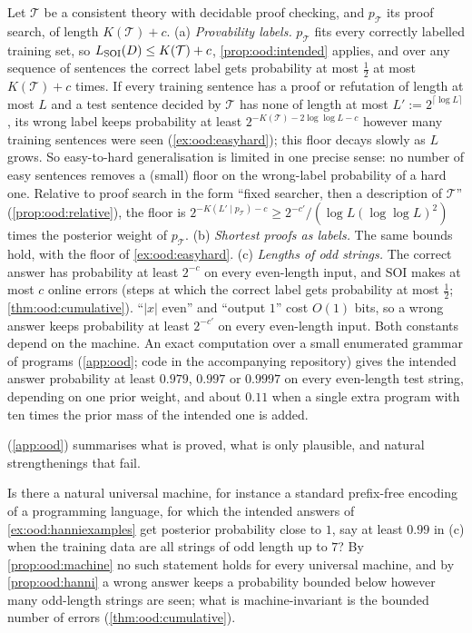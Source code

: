 \begin{example}\label{ex:ood:hanniexamples}
Let $\mathcal T$ be a consistent theory with decidable proof checking, and $p_{\mathcal T}$ its proof search, of length $K(\mathcal T)+c$.
(a) \emph{Provability labels.} $p_{\mathcal T}$ fits every correctly labelled training set, so $L_{\mathrm{SOI}}(D)\le K(\mathcal T)+c$, \cref{prop:ood:intended} applies, and over any sequence of sentences the correct label gets probability at most $\frac12$ at most $K(\mathcal T)+c$ times. If every training sentence has a proof or refutation of length at most $L$ and a test sentence decided by $\mathcal T$ has none of length at most $L':=2^{\lceil\log L\rceil}$, its wrong label keeps probability at least $2^{-K(\mathcal T)-2\log\log L-c}$ however many training sentences were seen (\cref{ex:ood:easyhard}); this floor decays slowly as $L$ grows. So easy-to-hard generalisation is limited in one precise sense: no number of easy sentences removes a (small) floor on the wrong-label probability of a hard one. Relative to proof search in the form ``fixed searcher, then a description of $\mathcal T$'' (\cref{prop:ood:relative}), the floor is $2^{-K(L'\mid p_{\mathcal T})-c}\ge2^{-c'}/(\log L(\log\log L)^2)$ times the posterior weight of $p_{\mathcal T}$.
(b) \emph{Shortest proofs as labels.} The same bounds hold, with the floor of \cref{ex:ood:easyhard}.
(c) \emph{Lengths of odd strings.} The correct answer has probability at least $2^{-c}$ on every even-length input, and SOI makes at most $c$ online errors (steps at which the correct label gets probability at most $\frac12$; \cref{thm:ood:cumulative}). ``$|x|$ even'' and ``output $1$'' cost $O(1)$ bits, so a wrong answer keeps probability at least $2^{-c'}$ on every even-length input. Both constants depend on the machine. An exact computation over a small enumerated grammar of programs (\cref{app:ood}; code in the accompanying repository) gives the intended answer probability at least $0.979$, $0.997$ or $0.9997$ on every even-length test string, depending on one prior weight, and about $0.11$ when a single extra program with ten times the prior mass of the intended one is added.
\end{example}

 (\cref{app:ood}) summarises what is proved, what is only plausible, and natural strengthenings that fail.

\begin{question}\label{conj:ood:natural}
Is there a natural universal machine, for instance a standard prefix-free encoding of a programming language, for which the intended answers of \cref{ex:ood:hanniexamples} get posterior probability close to $1$, say at least $0.99$ in (c) when the training data are all strings of odd length up to $7$? By \cref{prop:ood:machine} no such statement holds for every universal machine, and by \cref{prop:ood:hanni} a wrong answer keeps a probability bounded below however many odd-length strings are seen; what is machine-invariant is the bounded number of errors (\cref{thm:ood:cumulative}).
\end{question}
